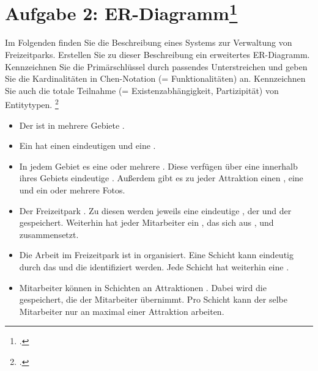 \documentclass{lehramt-informatik-minimal}
\begin{document}
\section{Aufgabe 2: ER-Diagramm\footcite[Seite 2]{db:pu:1}}

\noindent
Im Folgenden finden Sie die Beschreibung eines Systems zur Verwaltung
von Freizeitparks. Erstellen Sie zu dieser Beschreibung ein
erweitertes ER-Diagramm. Kennzeichnen Sie die Primär\-schlüssel durch
passendes Unterstreichen und geben Sie die Kardinalitäten in
Chen-Notation (= Funktionalitäten) an. Kennzeichnen Sie auch die totale
Teilnahme (= Existenzabhängigkeit, Partizipität) von Entitytypen.
\footcite[DB/ST - Herbst 2018 (46116, nicht vertieft), Thema 1, TA II, A2]{examen:46116:2018:09}

\begin{itemize}
\item Der  ist in mehrere Gebiete
.

\item Ein  hat einen eindeutigen 
und eine .

\item In jedem Gebiet  es eine oder mehrere
. Diese verfügen über eine innerhalb ihres
Gebiets eindeutige . Außerdem gibt es zu jeder
Attraktion einen , eine 
und ein oder mehrere Fotos.

\item Der Freizeitpark  . Zu
diesen werden jeweils eine eindeutige , der
 und der  gespeichert.
Weiterhin hat jeder Mitarbeiter ein , das sich
aus ,  und 
zusammensetzt.

\item Die Arbeit im Freizeitpark ist in 
organisiert. Eine Schicht kann eindeutig durch das 
und die  identifiziert werden. Jede Schicht hat
weiterhin eine .

\item Mitarbeiter können in Schichten an Attraktionen
. Dabei wird die 
gespeichert, die der Mitarbeiter übernimmt. Pro Schicht kann der selbe
Mitarbeiter nur an maximal einer Attraktion arbeiten.
\end{itemize}
\end{document}
